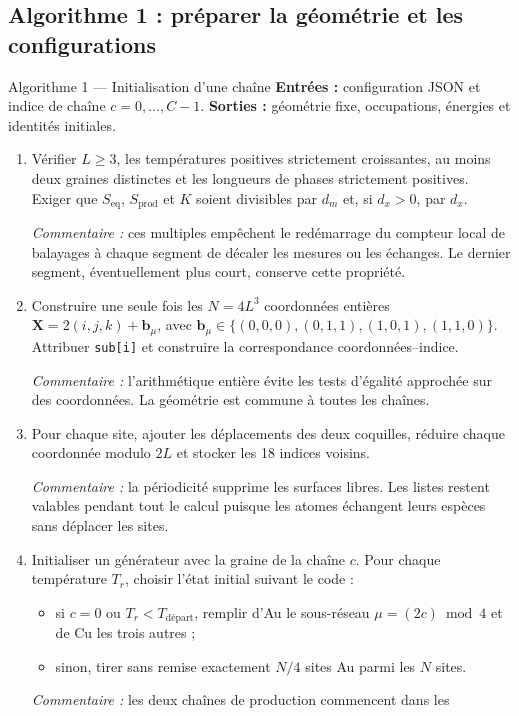 \documentclass[10pt,a4paper]{article}
\begin{document}
\subsection{Algorithme 1 : préparer la géométrie et les configurations}
\begin{algocode}{Algorithme 1 --- Initialisation d'une chaîne}
\textbf{Entrées :} configuration JSON et indice de chaîne $c=0,\ldots,C-1$.
\textbf{Sorties :} géométrie fixe, occupations, énergies et identités initiales.
\begin{enumerate}
\item Vérifier $L\ge3$, les températures positives strictement croissantes,
au moins deux graines distinctes et les longueurs de phases strictement
positives. Exiger que $S_{\mathrm{eq}}$, $S_{\mathrm{prod}}$ et $K$ soient
divisibles par $d_m$ et, si $d_x>0$, par $d_x$.
\par\textit{Commentaire :} ces multiples empêchent le redémarrage du compteur
local de balayages à chaque segment de décaler les mesures ou les échanges.
Le dernier segment, éventuellement plus court, conserve cette propriété.
\item Construire une seule fois les $N=4L^3$ coordonnées entières
$\mathbf X=2(i,j,k)+\mathbf b_\mu$, avec
$\mathbf b_\mu\in\{(0,0,0),(0,1,1),(1,0,1),(1,1,0)\}$.
Attribuer \texttt{sub[i]} et construire la correspondance coordonnées--indice.
\par\textit{Commentaire :} l'arithmétique entière évite les tests d'égalité
approchée sur des coordonnées. La géométrie est commune à toutes les chaînes.
\item Pour chaque site, ajouter les déplacements des deux coquilles,
réduire chaque coordonnée modulo $2L$ et stocker les 18 indices voisins.
\par\textit{Commentaire :} la périodicité supprime les surfaces libres.
Les listes restent valables pendant tout le calcul puisque les atomes
échangent leurs espèces sans déplacer les sites.
\item Initialiser un générateur avec la graine de la chaîne $c$.
Pour chaque température $T_r$, choisir l'état initial suivant le code :
\begin{itemize}
\item si $c=0$ ou $T_r<T_{\text{départ}}$, remplir d'Au le sous-réseau
$\mu=(2c)\bmod4$ et de Cu les trois autres ;
\item sinon, tirer sans remise exactement $N/4$ sites Au parmi les $N$ sites.
\end{itemize}
\textit{Commentaire :} les deux chaînes de production commencent dans les

\end{enumerate}
\end{algocode}
\end{document}
